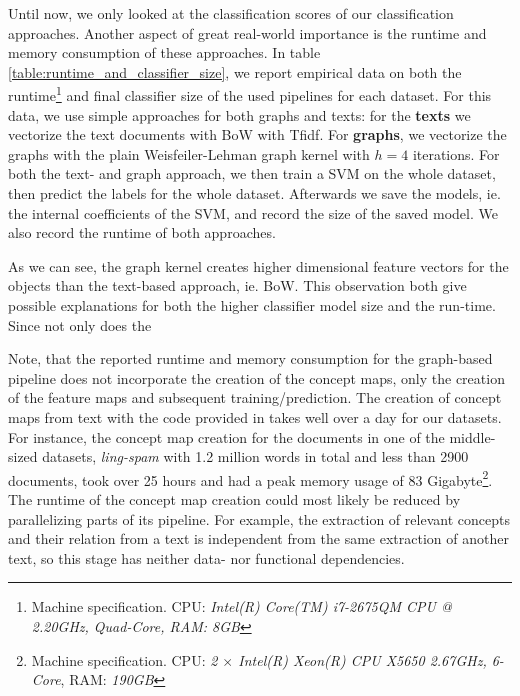 
Until now, we only looked at the classification scores of our classification approaches.
Another aspect of great real-world importance is the runtime and memory consumption of these approaches.
In table \ref{table:runtime_and_classifier_size}, we report empirical data on both the runtime\footnote{Machine specification. CPU: \textit{Intel(R) Core(TM) i7-2675QM CPU @ 2.20GHz, Quad-Core, RAM: \textit{8GB}}} and final classifier size of the used pipelines for each dataset.
For this data, we use simple approaches for both graphs and texts: for the \textbf{texts} we vectorize the text documents with BoW with Tfidf.
For \textbf{graphs}, we vectorize the graphs with the plain Weisfeiler-Lehman graph kernel with $h = 4$ iterations.
For both the text- and graph approach, we then train a SVM on the whole dataset, then predict the labels for the whole dataset. Afterwards we save the models, ie. the internal coefficients of the SVM, and record the size of the saved model.
We also record the runtime of both approaches.

As we can see, the graph kernel creates higher dimensional feature vectors for the objects than the text-based approach, ie. BoW. 
This observation both give possible explanations for both the higher classifier model size and the run-time. Since not only does the 

Note, that the reported runtime and memory consumption for the graph-based pipeline does not incorporate the creation of the concept maps, only the creation of the feature maps and subsequent training/prediction.
The creation of concept maps from text with the code provided in \cite{Falke2017b} takes well over a day for our datasets.
For instance, the concept map creation for the documents  in one of the middle-sized datasets, \textit{ling-spam} with 1.2 million words in total and less than 2900 documents, took over 25 hours and had a peak memory usage of 83 Gigabyte\footnote{Machine specification. CPU: \textit{2 $\times$ Intel(R) Xeon(R) CPU X5650 \@ 2.67GHz, 6-Core}, RAM: \textit{190GB}}.
The runtime of the concept map creation could most likely be reduced by parallelizing parts of its pipeline.
For example, the extraction of relevant concepts and their relation from a text is independent from the same extraction of another text, so this stage has neither data- nor functional dependencies.


